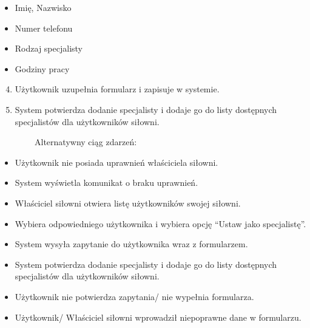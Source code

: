 \documentclass[
]{article}
\providecommand{\tightlist}{%
  \setlength{\itemsep}{0pt}\setlength{\parskip}{0pt}}
\begin{document}
\begin{itemize}
\tightlist
\item
  {Imię, Nazwisko}
\item
  {Numer telefonu}
\item
  {Rodzaj specjalisty}
\item
  {Godziny pracy}
\end{itemize}

\begin{enumerate}
\setcounter{enumi}{3}
\tightlist
\item
  {Użytkownik uzupełnia formularz i zapisuje w systemie.}
\item
  {System potwierdza dodanie specjalisty i dodaje go do listy dostępnych
  specjalistów dla użytkowników siłowni.}
\end{enumerate}

{~~~~~~~~Alternatywny ciąg zdarzeń:}

\begin{itemize}
\tightlist
\item
  {Użytkownik nie posiada uprawnień właściciela siłowni.}
\end{itemize}

\begin{itemize}
\tightlist
\item
  {System wyświetla komunikat o braku uprawnień.}
\end{itemize}

\begin{itemize}
\tightlist
\item
  {Właściciel siłowni otwiera listę użytkowników swojej siłowni.}
\end{itemize}

\begin{itemize}
\tightlist
\item
  {Wybiera odpowiedniego użytkownika i wybiera opcję ``Ustaw jako
  specjalistę''.}
\item
  {System wysyła zapytanie do użytkownika wraz z formularzem.}
\item
  {System potwierdza dodanie specjalisty i dodaje go do listy dostępnych
  specjalistów dla użytkowników siłowni.}
\end{itemize}

\begin{itemize}
\tightlist
\item
  {Użytkownik nie potwierdza zapytania/ nie wypełnia formularza.}
\item
  {Użytkownik/ Właściciel siłowni wprowadził niepoprawne dane w
  formularzu.}
\end{itemize}
\end{document}
